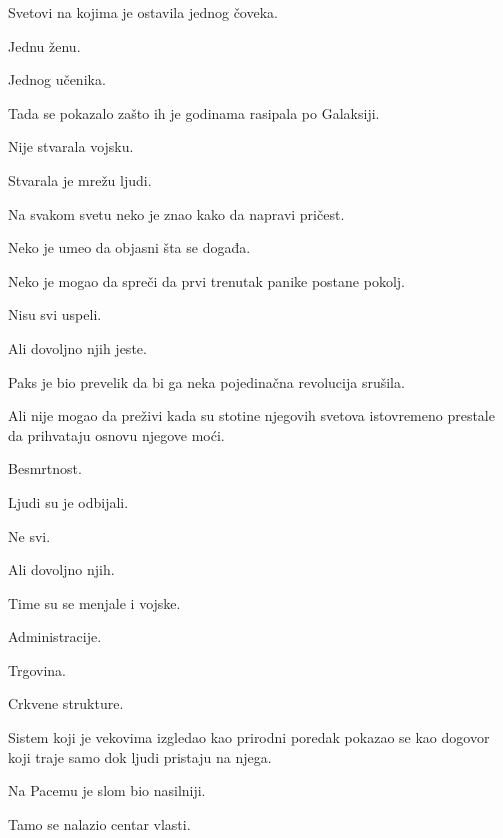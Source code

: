 Svetovi na kojima je ostavila jednog čoveka.

Jednu ženu.

Jednog učenika.

\bigskip

Tada se pokazalo zašto ih je godinama rasipala po Galaksiji.

\bigskip

Nije stvarala vojsku.

\bigskip

Stvarala je mrežu ljudi.

\bigskip

Na svakom svetu neko je znao kako da napravi pričest.

Neko je umeo da objasni šta se događa.

Neko je mogao da spreči da prvi trenutak panike postane pokolj.

\bigskip

Nisu svi uspeli.

\bigskip

Ali dovoljno njih jeste.

\bigskip

Paks je bio prevelik da bi ga neka pojedinačna revolucija srušila.

\bigskip

Ali nije mogao da preživi kada su stotine njegovih svetova istovremeno prestale da prihvataju osnovu njegove moći.

\bigskip

Besmrtnost.

\bigskip

Ljudi su je odbijali.

\bigskip

Ne svi.

Ali dovoljno njih.

\bigskip

Time su se menjale i vojske.

Administracije.

Trgovina.

Crkvene strukture.

\bigskip

Sistem koji je vekovima izgledao kao prirodni poredak pokazao se kao dogovor koji traje samo dok ljudi pristaju na njega.

\bigskip

Na Pacemu je slom bio nasilniji.

\bigskip

Tamo se nalazio centar vlasti.

